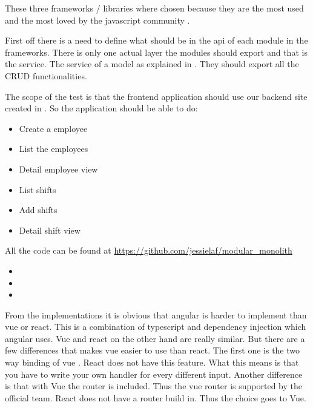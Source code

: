 These three frameworks / libraries where chosen because they are the most used and the most loved by the javascript community \cite{allFrontendFrameworks}.

First off there is a need to define what should be in the api of each module in the frameworks. There is only one actual layer the modules should export and that is the service. The service of a model as explained in . They should export all the CRUD functionalities.

The scope of the test is that the frontend application should use our backend site created in . So the application should be able to do:

\begin{itemize}
    \item Create a employee
    \item List the employees
    \item Detail employee view
    \item List shifts
    \item Add shifts
    \item Detail shift view
\end{itemize}

All the code can be found at \url{https://github.com/jessielaf/modular_monolith}

\begin{itemize}
    \item {}
    \item {}
    \item {}
\end{itemize}

From the implementations it is obvious that angular is harder to implement than vue or react. This is a combination of typescript and dependency injection which angular uses. Vue and react on the other hand are really similar. But there are a few differences that makes vue easier to use than react. The first one is the two way binding of vue \cite{vueTwoWay}. React does not have this feature. What this means is that you have to write your own handler for every different input. Another difference is that with Vue the router is included. Thus the vue router is supported by the official team. React does not have a router build in. Thus the choice goes to Vue.
